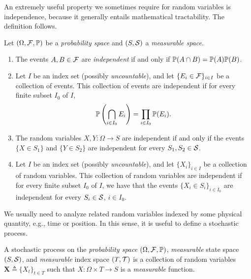 An extremely useful property we sometimes require for random variables is independence, because it generally entails mathematical tractability. The definition follows.
%
\begin{definition}
    Let $(\Omega,\cal{F},\P)$ be a \textit{probability space} and $(S,\cal{S})$ a \textit{measurable space}.%
    \begin{enumerate}[label=(\alph*), noitemsep]
        \item The events $A,B\in\cal F$ are \textit{independent} if and only if $\P(A\cap B) = \P(A)\P(B)$.
        \item Let $I$ be an index set (possibly \textit{uncountable}), and let $\{E_i\in\cal{F}\}_{i\in I}$ be a collection of events. This collection of events are independent if for every finite subset $I_0$ of $I$,
        \begin{align*}
            \P\left( \bigcap_{i\in I_0} E_i\right) = \prod_{i\in I_0} \P(E_i).
        \end{align*}
        \item The random variables $X,Y : \Omega \longrightarrow S$ are independent if and only if the events $\{X \in S_1\}$ and $\{Y \in S_2\}$ are independent for every $S_1,S_2\in\cal{S}$.
        \item Let $I$ be an index set (possibly \textit{uncountable}), and let $\{X_i\}_{i\in I}$ be a collection of random variables. This collection of random variables are independent if for every finite subset $I_0$ of $I$, we have that the events $\{X_i\in S_i\}_{i\in I_0}$ are independent for every $S_i\in\cal{S}$, $i\in I_0$.
    \end{enumerate}
\end{definition}

We usually need to analyze related random variables indexed by some physical quantity, e.g., time or position.
%
In this sense, it is useful to define a stochastic process.
%
\begin{definition} \label{def:stoch_process}
    A stochastic process on the \textit{probability space} $(\Omega,\cal F, \P)$, \textit{measurable} state space $(S,\cal S)$, and \textit{measurable} index space $(T,\cal{T})$ is a collection of random variables $\bm{X}\triangleq\{X_t\}_{t\in T}$ such that $X: \Omega \times T \longrightarrow S$ is a \textit{measurable} function.
\end{definition}

